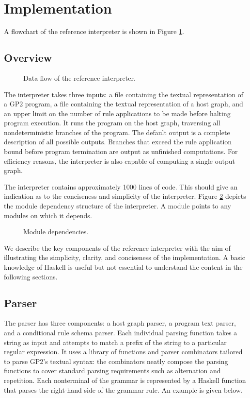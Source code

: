\section{Implementation}

A flowchart of the reference interpreter is shown in Figure \ref{fig:architecture}.
\subsection{Overview}

\begin{figure}
\centering

\caption{Data flow of the reference interpreter.} \label{fig:architecture}
\end{figure}

The interpreter takes three inputs: a file containing the textual representation of a GP2 program, a file containing the textual representation of a host graph, and an upper limit on the number of rule applications to be made before halting program execution. It runs the program on the host graph, traversing all nondeterministic branches of the program. The default output is a complete description of all possible outputs. Branches that exceed the rule application bound before program termination are output as unfinished computations. For efficiency reasons, the interpreter is also capable of computing a single output graph. 

The interpreter contains approximately 1000 lines of code. This should give an indication as to the conciseness and simplicity of the interpreter. Figure \ref{fig:modules} depicts the module dependency structure of the interpreter. A module points to any modules on which it depends. 

\begin{figure}
\centering

\caption{Module dependencies.} \label{fig:modules}
\end{figure}

We describe the key components of the reference interpreter with the aim of illustrating the simplicity, clarity, and conciseness of the implementation. A basic knowledge of Haskell is useful but not essential to understand the content in the following sections.

\subsection{Parser}
The parser has three components: a host graph parser, a program text parser, and a conditional rule schema parser. Each individual parsing function takes a string as input and attempts to match a prefix of the string to a particular regular expression. It uses a library of functions and parser combinators tailored to parse GP2's textual syntax: the combinators neatly compose the parsing functions to cover standard parsing requirements such as alternation and repetition. Each nonterminal of the grammar is represented by a Haskell function that parses the right-hand side of the grammar rule. An example is given below.

